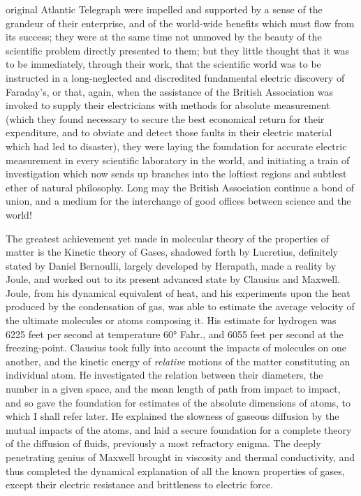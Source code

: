 \documentclass[a4paper, 11pt, oneside, english]{article}
\begin{document}
original Atlantic Telegraph were impelled and supported by a sense of the grandeur of their enterprise, and of the world-wide benefits which must flow from its success; they were at the same time not unmoved by the beauty of the scientific problem directly presented to them; but they little thought that it was to be immediately, through their work, that the scientific world was to be instructed in a long-neglected and discredited fundamental electric discovery of Faraday's, or that, again, when the assistance of the British Association was invoked to supply their electricians with methods for absolute measurement (which they found necessary to secure the best economical return for their expenditure, and to obviate and detect those faults in their electric material which had led to disaster), they were laying the foundation for accurate electric measurement in every scientific laboratory in the world, and initiating a train of investigation which now sends up branches into the loftiest regions and subtlest ether of natural philosophy. Long may the British Association continue a bond of union, and a medium for the interchange of good offices between science and the world!

The greatest achievement yet made in molecular theory of the properties of matter is the Kinetic theory of Gases, shadowed forth by Lucretius, definitely stated by Daniel Bernoulli, largely developed by Herapath, made a reality by Joule, and worked out to its present advanced state by Clausius and Maxwell. Joule, from his dynamical equivalent of heat, and his experiments upon the heat produced by the condensation of gas, was able to estimate the average velocity of the ultimate molecules or atoms composing it. His estimate for hydrogen was 6225 feet per second at temperature 60° Fahr., and 6055 feet per second at the freezing-point. Clausius took fully into account the impacts of molecules on one another, and the kinetic energy of \emph{relative} motions of the matter constituting an individual atom. He investigated the relation between their diameters, the number in a given space, and the mean length of path from impact to impact, and so gave the foundation for estimates of the absolute dimensions of atoms, to which I shall refer later. He explained the slowness of gaseous diffusion by the mutual impacts of the atoms, and laid a secure foundation for a complete theory of the diffusion of fluids, previously a most refractory enigma. The deeply penetrating genius of Maxwell brought in viscosity and thermal conductivity, and thus completed the dynamical explanation of all the known properties of gases, except their electric resistance and brittleness to electric force.
\end{document}
